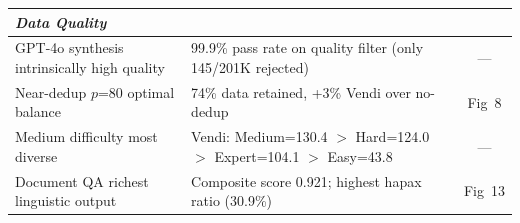 \begin{table}[t]
\begin{tabular}{p{}p{}c}
\midrule
\multicolumn{3}{l}{\textit{Data Quality}} \\
\midrule
GPT-4o synthesis intrinsically high quality & 99.9\% pass rate on quality filter (only 145/201K rejected) & --- \\
Near-dedup $p$=80 optimal balance & 74\% data retained, +3\% Vendi over no-dedup & Fig~8 \\
Medium difficulty most diverse & Vendi: Medium=130.4 $>$ Hard=124.0 $>$ Expert=104.1 $>$ Easy=43.8 & --- \\
Document QA richest linguistic output & Composite score 0.921; highest hapax ratio (30.9\%) & Fig~13 \\
\bottomrule
\end{tabular}
\end{table}